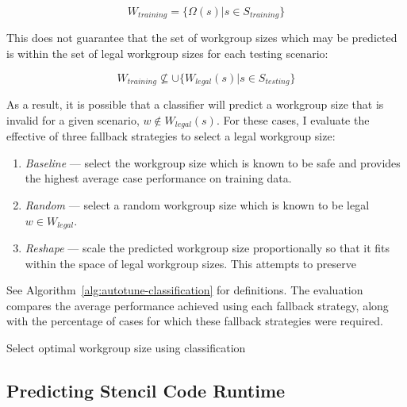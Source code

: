 \begin{equation}
W_{training} = \{ \Omega(s) | s \in S_{training} \}
\end{equation}

This does not guarantee that the set of workgroup sizes which may be
predicted is within the set of legal workgroup sizes for each testing
scenario:

\begin{equation}
W_{training} \nsubseteq \cup \{ W_{legal}(s) | s \in S_{testing} \}
\end{equation}

As a result, it is possible that a classifier will predict a workgroup
size that is invalid for a given scenario, $w \not\in W_{legal}(s)$.
For these cases, I evaluate the effective of three fallback strategies
to select a legal workgroup size:

\begin{enumerate}
\item \emph{Baseline} --- select the workgroup size which is known to
  be safe and provides the highest average case performance on
  training data.
\item \emph{Random} --- select a random workgroup size which is known
  to be legal $w \in W_{legal}$.
\item \emph{Reshape} --- scale the predicted workgroup size
  proportionally so that it fits within the space of legal workgroup
  sizes. This attempts to preserve
\end{enumerate}

See Algorithm~\ref{alg:autotune-classification} for definitions. The
evaluation compares the average performance achieved using each
fallback strategy, along with the percentage of cases for which these
fallback strategies were required.

\begin{algorithm}

\caption{Select optimal workgroup size using classification}
\label{alg:autotune-classification}
\end{algorithm}


\subsection{Predicting Stencil Code Runtime}

